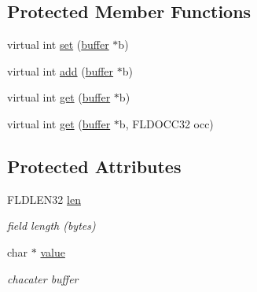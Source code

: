 \subsection*{Protected Member Functions}
\begin{DoxyCompactItemize}
\item 
virtual int \hyperlink{classatmi_1_1_tfield_3_01char_01_5_01_4_adf1bb05dd57c8ffe65cf03b59d5c3555}{set} (\hyperlink{classatmi_1_1buffer}{buffer} $\ast$b)
\item 
virtual int \hyperlink{classatmi_1_1_tfield_3_01char_01_5_01_4_a90152491e3b472670b43b9fc909bf6f1}{add} (\hyperlink{classatmi_1_1buffer}{buffer} $\ast$b)
\item 
virtual int \hyperlink{classatmi_1_1_tfield_3_01char_01_5_01_4_afa2f2144f26a0fc54580e16f2db847fd}{get} (\hyperlink{classatmi_1_1buffer}{buffer} $\ast$b)
\item 
virtual int \hyperlink{classatmi_1_1_tfield_3_01char_01_5_01_4_a4e656e9ef968329f428bbb85287e2208}{get} (\hyperlink{classatmi_1_1buffer}{buffer} $\ast$b, F\+L\+D\+O\+C\+C32 occ)
\end{DoxyCompactItemize}
\subsection*{Protected Attributes}
\begin{DoxyCompactItemize}
\item 
\hypertarget{classatmi_1_1_tfield_3_01char_01_5_01_4_ab48401db01ecdb71e41bb929562cbaf2}{}F\+L\+D\+L\+E\+N32 \hyperlink{classatmi_1_1_tfield_3_01char_01_5_01_4_ab48401db01ecdb71e41bb929562cbaf2}{len}\label{classatmi_1_1_tfield_3_01char_01_5_01_4_ab48401db01ecdb71e41bb929562cbaf2}

\begin{DoxyCompactList}\small\item\em field length (bytes) \end{DoxyCompactList}\item 
\hypertarget{classatmi_1_1_tfield_3_01char_01_5_01_4_a704b8534e0b8680f08b6dde5b06d2317}{}char $\ast$ \hyperlink{classatmi_1_1_tfield_3_01char_01_5_01_4_a704b8534e0b8680f08b6dde5b06d2317}{value}\label{classatmi_1_1_tfield_3_01char_01_5_01_4_a704b8534e0b8680f08b6dde5b06d2317}

\begin{DoxyCompactList}\small\item\em chacater buffer \end{DoxyCompactList}\end{DoxyCompactItemize}


